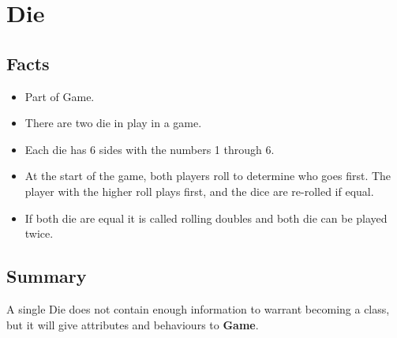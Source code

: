 \section{Die}

\subsection{Facts}

\begin{itemize} [itemsep=2pt,parsep=2pt]
    \item Part of Game.
    \item There are two die in play in a game.
    \item Each die has 6 sides with the numbers 1 through 6.
    \item At the start of the game, both players roll to determine who goes first.
    The player with the higher roll plays first, and the dice are re-rolled if equal.
    \item If both die are equal it is called rolling doubles and both die can be played twice.
\end{itemize}


\subsection{Summary}
A single Die does not contain enough information to warrant becoming a class, but it will give attributes and behaviours to \textbf{Game}.

